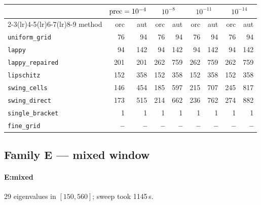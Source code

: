 \begin{center}
\small
\begin{tabular}{lrrrrrrrr}
\toprule
& \multicolumn{2}{c}{$\mathrm{prec}=10^{-4}$} & \multicolumn{2}{c}{$10^{-8}$} & \multicolumn{2}{c}{$10^{-11}$} & \multicolumn{2}{c}{$10^{-14}$} \\
\cmidrule(lr){2-3}\cmidrule(lr){4-5}\cmidrule(lr){6-7}\cmidrule(lr){8-9}
method & orc & aut & orc & aut & orc & aut & orc & aut \\
\midrule
\texttt{uniform\_grid} & 76 & 94 & 76 & 94 & 76 & 94 & 76 & 94 \\
\texttt{lappy} & 94 & 142 & 94 & 142 & 94 & 142 & 94 & 142 \\
\texttt{lappy\_repaired} & 201 & 201 & 262 & 759 & 262 & 759 & 262 & 759 \\
\texttt{lipschitz} & 152 & 358 & 152 & 358 & 152 & 358 & 152 & 358 \\
\texttt{swing\_cells} & 146 & 454 & 185 & 597 & 215 & 707 & 245 & 817 \\
\texttt{swing\_direct} & 173 & 515 & 214 & 662 & 236 & 762 & 274 & 882 \\
\midrule
\texttt{single\_bracket} & 1 & 1 & 1 & 1 & 1 & 1 & 1 & 1 \\
\texttt{fine\_grid} & \textbf{--} & \textbf{--} & \textbf{--} & \textbf{--} & \textbf{--} & \textbf{--} & \textbf{--} & \textbf{--} \\
\bottomrule
\end{tabular}
\end{center}

\subsection{Family E --- mixed window}

\paragraph{E:mixed} 29 eigenvalues in $[150, 560]$; sweep took 1145\,s.

